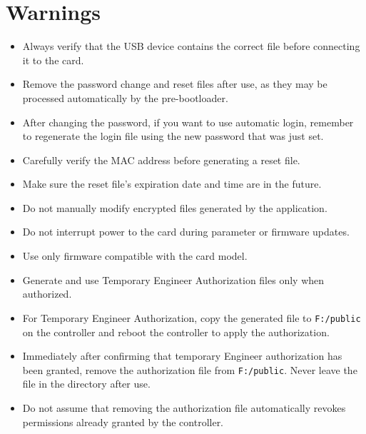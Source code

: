﻿\documentclass[11pt,a4paper]{article}
\newcommand{\filename}[1]{\texttt{#1}}
\begin{document}
\section{Warnings}

\begin{itemize}
    \item Always verify that the USB device contains the
    correct file before connecting it to the card.

    \item Remove the password change and reset files after use,
    as they may be processed automatically by the pre-bootloader.

    \item After changing the password, if you want to use automatic
    login, remember to regenerate the login file using the new
    password that was just set.

    \item Carefully verify the MAC address before generating
    a reset file.

    \item Make sure the reset file's expiration date and
    time are in the future.

    \item Do not manually modify encrypted files generated
    by the application.

    \item Do not interrupt power to the card during parameter
    or firmware updates.

    \item Use only firmware compatible with the card model.

    \item Generate and use Temporary Engineer Authorization
    files only when authorized.

    \item For Temporary Engineer Authorization, copy the generated
    file to \filename{F:/public} on the controller and reboot
    the controller to apply the authorization.

    \item Immediately after confirming that temporary Engineer
    authorization has been granted, remove the authorization
    file from \filename{F:/public}. Never leave the file in
    the directory after use.

    \item Do not assume that removing the authorization file
    automatically revokes permissions already granted by
    the controller.
\end{itemize}
\end{document}
